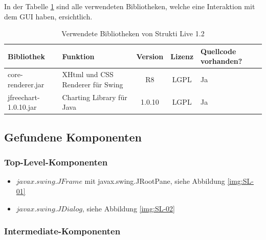   In der Tabelle \ref{tab:bibliothekenStruktiLive} sind alle verwendeten
  Bibliotheken, welche eine Interaktion mit dem \ac{GUI} haben, ersichtlich.
  \newline
  
  \begin{table}[ht]
    \begin{center}
      \begin{tabular}{lp{4.5cm}ccp{2cm}}
        \toprule
        Bibliothek & Funktion & Version & Lizenz & Quellcode vorhanden?\\
        \midrule
        core-renderer.jar & XHtml und CSS Renderer für Swing & R8 & LGPL & Ja\\
        jfreechart-1.0.10.jar & Charting Library für Java & 1.0.10 & LGPL & Ja\\
        \bottomrule
      \end{tabular}
      \caption{Verwendete Bibliotheken von Strukti Live 1.2}
      \label{tab:bibliothekenStruktiLive}
    \end{center}
  \end{table}
  
  \subsection{Gefundene Komponenten}
  
  \subsubsection{Top-Level-Komponenten}
  
  \begin{itemize}
    \item \(javax.swing.JFrame\) mit javax.swing.JRootPane, siehe Abbildung
    \ref{img:SL-01}
    \item \(javax.swing.JDialog\), siehe Abbildung \ref{img:SL-02}
  \end{itemize}
  
  \subsubsection{Intermediate-Komponenten}
  
